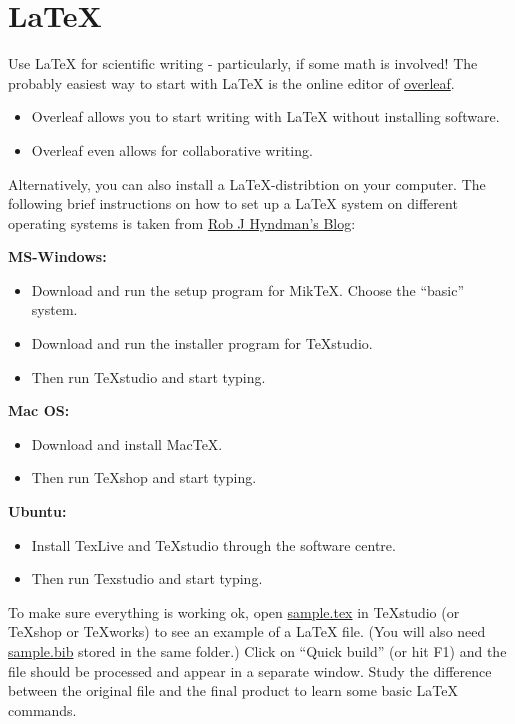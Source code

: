 \documentclass[
]{book}
\providecommand{\tightlist}{%
  \setlength{\itemsep}{0pt}\setlength{\parskip}{0pt}}
\begin{document}
\hypertarget{latex}{%
\section{LaTeX}\label{latex}}

Use LaTeX for scientific writing - particularly, if some math is involved! The probably easiest way to start with LaTeX is the online editor of \href{https://overleaf.com/}{overleaf}.

\begin{itemize}
\tightlist
\item
  Overleaf allows you to start writing with LaTeX without installing software.
\item
  Overleaf even allows for collaborative writing.
\end{itemize}

\hfill\break

Alternatively, you can also install a LaTeX-distribtion on your computer. The following brief instructions on how to set up a LaTeX system on different operating systems is taken from \href{https://robjhyndman.com/hyndsight/latex-setup/}{Rob J Hyndman's Blog}:

\textbf{MS-Windows:}

\begin{itemize}
\tightlist
\item
  Download and run the setup program for MikTeX. Choose the ``basic'' system.
\item
  Download and run the installer program for TeXstudio.
\item
  Then run TeXstudio and start typing.
\end{itemize}

\textbf{Mac OS:}

\begin{itemize}
\tightlist
\item
  Download and install MacTeX.
\item
  Then run TeXshop and start typing.
\end{itemize}

\textbf{Ubuntu:}

\begin{itemize}
\tightlist
\item
  Install TexLive and TeXstudio through the software centre.
\item
  Then run Texstudio and start typing.
\end{itemize}

To make sure everything is working ok, open \href{https://robjhyndman.com/research/sample.tex}{sample.tex} in TeXstudio (or TeXshop or TeXworks) to see an example of a LaTeX file. (You will also need \href{https://robjhyndman.com/research/sample.bib}{sample.bib} stored in the same folder.) Click on ``Quick build'' (or hit F1) and the file should be processed and appear in a separate window. Study the difference between the original file and the final product to learn some basic LaTeX commands.
\end{document}
